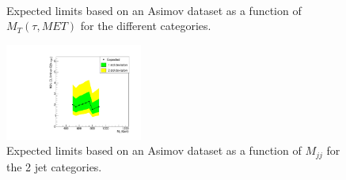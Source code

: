 \begin{figure}[!htbp]
     \centering
     \\
     \caption{Expected limits based on an Asimov dataset as a function of $M_T(\tau, MET)$ for the different categories.}
     \label{fig:optMT}
\end{figure}

\begin{figure}[!htbp]
\centering
\includegraphics[width=0.4\textwidth]{chapter6/Tuning/vbf_vbfvbfMass.pdf}
\caption{Expected limits based on an Asimov dataset as a function of $M_{jj}$ for the 2 jet categories.}
\label{fig:optVBFmass}
\end{figure}




